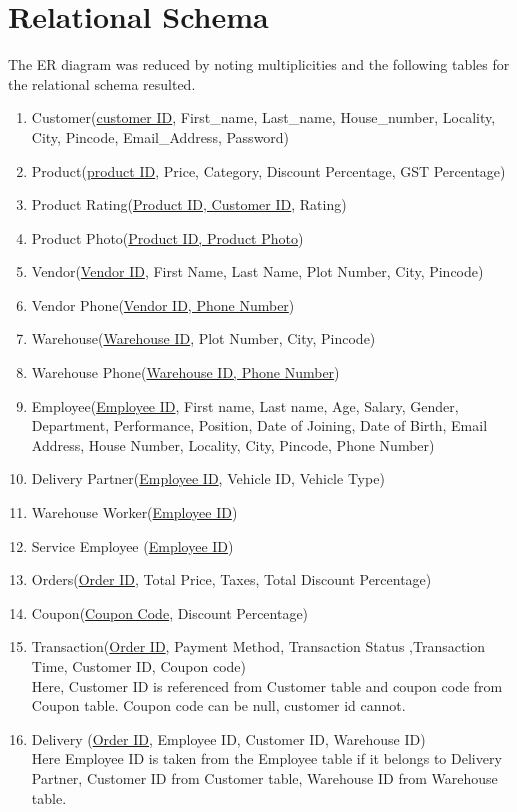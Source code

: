 \documentclass[12pt]{report}
\begin{document}
\chapter{Relational Schema}
The ER diagram was reduced by noting multiplicities and the following tables for the relational schema resulted.

\begin{enumerate}
	\item Customer(\underline{customer ID}, First\_name, Last\_name, House\_number, Locality, City, Pincode, Email\_Address, Password)
	\item Product(\underline{product ID}, Price, Category, Discount Percentage, GST Percentage)
	\item Product Rating(\underline{Product ID, Customer ID}, Rating)
	\item Product Photo(\underline{Product ID, Product Photo})
	\item Vendor(\underline{Vendor ID}, First Name, Last Name, Plot Number, City, Pincode)
	\item Vendor Phone(\underline{Vendor ID, Phone Number})
	\item Warehouse(\underline{Warehouse ID}, Plot Number, City, Pincode)
	\item Warehouse Phone(\underline{Warehouse ID, Phone Number})
	\item Employee(\underline{Employee ID}, First name, Last name, Age, Salary, Gender, Department, Performance, Position, Date of Joining, Date of Birth, Email Address, House Number, Locality, City, Pincode, Phone Number)
	\item Delivery Partner(\underline{Employee ID}, Vehicle ID, Vehicle Type)
	\item Warehouse Worker(\underline{Employee ID})
	\item Service Employee (\underline{Employee ID})
	\item Orders(\underline{Order ID}, Total Price, Taxes, Total Discount Percentage)
	\item Coupon(\underline{Coupon Code}, Discount Percentage)
	\item Transaction(\underline{Order ID}, Payment Method, Transaction Status ,Transaction Time, Customer ID, Coupon code)\\ Here, Customer ID is referenced from Customer table and coupon code from Coupon table. Coupon code can be null, customer id cannot.
	\item Delivery (\underline{Order ID}, Employee ID, Customer ID, Warehouse ID) \\ Here Employee ID is taken from the Employee table if it belongs to Delivery Partner, Customer ID from Customer table, Warehouse ID from Warehouse table.

\end{enumerate}
\end{document}
